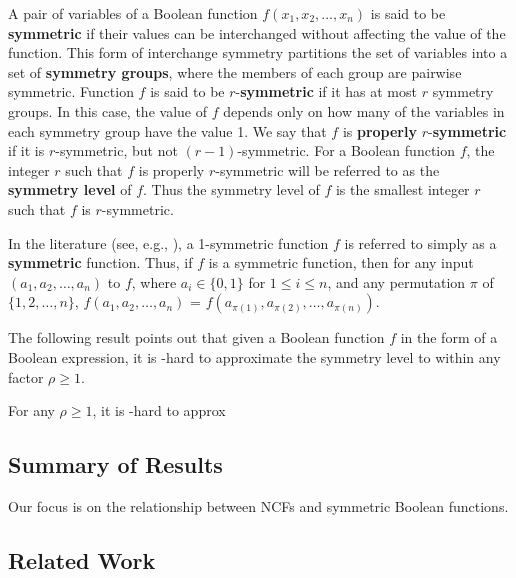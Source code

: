 A pair of variables of a Boolean function $f(x_1, x_2, \ldots, x_n)$ is
said to be \textbf{symmetric} if their values can be interchanged without
affecting the value of the function.
This form of interchange symmetry partitions the set of variables into a set of
\textbf{symmetry groups}, where the members of each group are pairwise symmetric.
Function $f$ is said to be
$r$-\textbf{symmetric} if it has at most $r$ symmetry groups.
In this case, the value of $f$
depends only on how many of the variables in each symmetry group have the value 1.
We say that $f$ is \textbf{properly} $r$-\textbf{symmetric} if
it is $r$-symmetric, but not $(r-1)$-symmetric.
For a Boolean function $f$, the integer $r$ such that $f$ is properly $r$-symmetric
will be referred to as the \textbf{symmetry level} of $f$.
Thus the symmetry level of $f$ is the smallest integer $r$ such that
$f$ is $r$-symmetric.

In the literature (see, e.g., \cite{Crama-Hammer-2011,HT-2016,Toth-etal-1977}),
a 1-symmetric function $f$ is referred to simply
as a \textbf{symmetric} function.
Thus, if $f$ is a symmetric function, then for any
input $(a_1, a_2, \ldots, a_n)$ to $f$, where $a_i \in \{0,1\}$ for
$1 \leq i \leq n$, and any permutation $\pi$ of $\{1, 2, \ldots, n\}$,
$f(a_1, a_2, \ldots, a_n)$ = $f(a_{\pi(1)}, a_{\pi(2)}, \ldots, a_{\pi(n)})$.

The following result points out that given a Boolean function $f$
in the form of a Boolean expression, it is \np-hard to approximate
the symmetry level to within any factor $\rho \geq 1$.

\begin{theorem}\label{thm:approx_sym_level_hard}
For any $\rho \geq 1$, it is \cnp-hard to approx
\end{theorem}



\subsection{Summary of Results}
\label{sse:contrib}

Our focus is on the relationship between NCFs and symmetric
Boolean functions.


\subsection{Related Work}
\label{sse:related}

